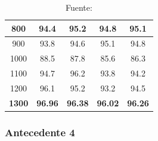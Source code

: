 \begin{table}[H]
{\begin{tabular}{ccccc}
    \hline
    800                                                                              & 94.4                    & 95.2                        & 94.8                       & 95.1                    \\ 
    \hline
    900                                                                              & 93.8                    & 94.6                        & 95.1                       & 94.8                    \\ 
    \hline
    1000                                                                             & 88.5                    & 87.8                        & 85.6                       & 86.3                    \\ 
    \hline
    1100                                                                             & 94.7                    & 96.2                        & 93.8                       & 94.2                    \\ 
    \hline
    1200                                                                             & 96.1                    & 95.2                        & 93.2                       & 94.5                    \\ 
    \hline
    \textbf{1300}                                                                             & \textbf{96.96}                   & \textbf{96.38}                       & \textbf{96.02}                      & \textbf{96.26}                   \\
    \hline
    \end{tabular}
  }
  \caption*{Fuente: \citet{StackedKNN}}
  \label{tab:Paper_3_4}
\end{table}

\subsubsection{Antecedente 4}

\lipsum[4]

